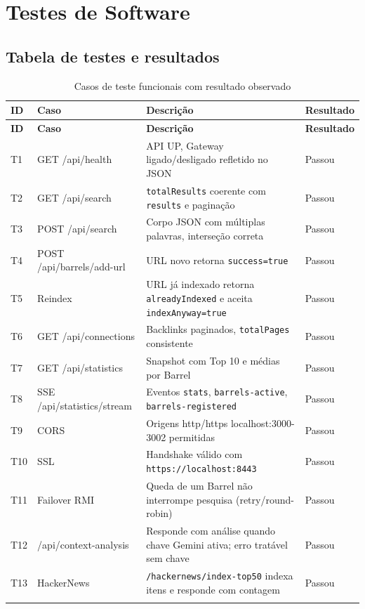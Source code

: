 \documentclass[12pt,a4paper]{article}
\begin{document}
\newpage

\section{Testes de Software}

\subsection{Tabela de testes e resultados}
\begin{longtable}{|p{1cm}|p{5cm}|p{5.5cm}|p{2.2cm}|}
\hline
\textbf{ID} & \textbf{Caso} & \textbf{Descrição} & \textbf{Resultado} \\
\hline
\endfirsthead
\hline
\textbf{ID} & \textbf{Caso} & \textbf{Descrição} & \textbf{Resultado} \\
\hline
\endhead
\hline
\endfoot
T1 & GET /api/health & API UP, Gateway ligado/desligado refletido no JSON & Passou \\
\hline
T2 & GET /api/search & \texttt{totalResults} coerente com \texttt{results} e paginação & Passou \\
\hline
T3 & POST /api/search & Corpo JSON com múltiplas palavras, interseção correta & Passou \\
\hline
T4 & POST /api/barrels/add-url & URL novo retorna \texttt{success=true} & Passou \\
\hline
T5 & Reindex & URL já indexado retorna \texttt{alreadyIndexed} e aceita \texttt{indexAnyway=true} & Passou \\
\hline
T6 & GET /api/connections & Backlinks paginados, \texttt{totalPages} consistente & Passou \\
\hline
T7 & GET /api/statistics & Snapshot com Top 10 e médias por Barrel & Passou \\
\hline
T8 & SSE /api/statistics/stream & Eventos \texttt{stats}, \texttt{barrels-active}, \texttt{barrels-registered} & Passou \\
\hline
T9 & CORS & Origens http/https localhost:3000-3002 permitidas & Passou \\
\hline
T10 & SSL & Handshake válido com \texttt{https://localhost:8443} & Passou \\
\hline
T11 & Failover RMI & Queda de um Barrel não interrompe pesquisa (retry/round-robin) & Passou \\
\hline
T12 & /api/context-analysis & Responde com análise quando chave Gemini ativa; erro tratável sem chave & Passou \\
\hline
T13 & HackerNews & \texttt{/hackernews/index-top50} indexa itens e responde com contagem & Passou \\
\hline
\caption{Casos de teste funcionais com resultado observado}
\end{longtable}
\end{document}
